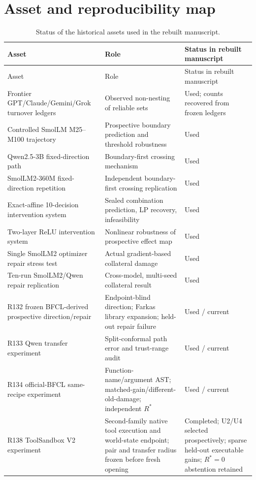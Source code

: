 \documentclass[11pt,letterpaper]{article}
\theoremstyle{plain}
\newcommand{\1}{\mathbf 1}
\begin{document}
\section{Asset and reproducibility map}
\small
\begin{longtable}{>{\raggedright\arraybackslash}p{}>{\raggedright\arraybackslash}p{}>{\raggedright\arraybackslash}p{}}
\caption{Status of the historical assets used in the rebuilt manuscript.}\label{tab:s_assets}\\
\toprule
Asset & Role & Status in rebuilt manuscript \\
\midrule
\endfirsthead
\toprule
Asset & Role & Status in rebuilt manuscript \\
\midrule
\endhead
Frontier GPT/Claude/Gemini/Grok turnover ledgers & Observed non-nesting of reliable sets & Used; counts recovered from frozen ledgers \\
Controlled SmolLM M25--M100 trajectory & Prospective boundary prediction and threshold robustness & Used \\
Qwen2.5-3B fixed-direction path & Boundary-first crossing mechanism & Used \\
SmolLM2-360M fixed-direction repetition & Independent boundary-first crossing replication & Used \\
Exact-affine 10-decision intervention system & Sealed combination prediction, LP recovery, infeasibility & Used \\
Two-layer ReLU intervention system & Nonlinear robustness of prospective effect map & Used \\
Single SmolLM2 optimizer repair stress test & Actual gradient-based collateral damage & Used \\
Ten-run SmolLM2/Qwen repair replication & Cross-model, multi-seed collateral result & Used \\
R132 frozen BFCL-derived prospective direction/repair & Endpoint-blind direction; Farkas library expansion; held-out repair failure & Used / current \\
R133 Qwen transfer experiment & Split-conformal path error and trust-range audit & Used / current \\
R134 official-BFCL same-recipe experiment & Function-name/argument AST; matched-gain/different-old-damage; independent $R^*$ & Used / current \\
R138 ToolSandbox V2 experiment & Second-family native tool execution and world-state endpoint; pair and transfer radius frozen before fresh opening & Completed; U2/U4 selected prospectively; sparse held-out executable gains; $R^*=0$ abstention retained \\

\end{longtable}
\end{document}
